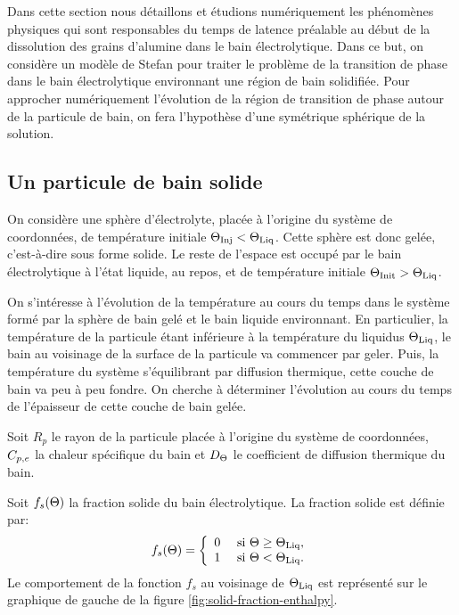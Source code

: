 Dans cette section nous détaillons et étudions numériquement les
phénomènes physiques qui sont responsables du temps de latence
préalable au début de la dissolution des grains d'alumine dans le bain
électrolytique. Dans ce but, on considère un modèle de Stefan pour
traiter le problème de la transition de phase dans le bain
électrolytique environnant une région de bain solidifiée. Pour
approcher numériquement l'évolution de la région de transition de
phase autour de la particule de bain, on fera l'hypothèse d'une
symétrique sphérique de la solution.

\subsection{Un particule de bain solide}
On considère une sphère d'électrolyte, placée à l'origine du système
de coordonnées, de température initiale $\Theta_\text{Inj}<\Theta_\text{Liq}$. Cette sphère
est donc gelée, c'est-à-dire sous forme solide. Le reste de l'espace
est occupé par le bain électrolytique à l'état liquide, au repos, et
de température initiale $\Theta_\text{Init} > \Theta_\text{Liq}$.

On s'intéresse à l'évolution de la température au cours du
temps dans le système formé par la sphère de bain gelé et le
bain liquide environnant. En particulier, la température de la
particule étant inférieure à la température du liquidus
$\Theta_\text{Liq}$, le bain au voisinage de la surface de la particule va
commencer par geler. Puis, la température du système s'équilibrant par
diffusion thermique, cette couche de bain va peu à peu fondre. On
cherche à déterminer l'évolution au cours du temps de l'épaisseur de
cette couche de bain gelée.

Soit $R_p$ le rayon de la particule placée à l'origine du
système de coordonnées, $C_{p,e}$ la chaleur spécifique du bain et
$D_\Theta$ le coefficient de diffusion thermique du bain.

Soit $f_s(\Theta)$ la fraction solide du bain électrolytique. La
fraction solide est définie par:
\begin{equation}
  f_s(\Theta) = \left\{
  \begin{array}{ll}
    0           & \text{ si } \Theta \geq \Theta_\text{Liq},\\
    1           & \text{ si } \Theta < \Theta_\text{Liq}.
  \end{array}
  \right.
\end{equation}
Le comportement de la fonction $f_s$ au voisinage de $\Theta_\text{Liq}$ est
représenté sur le graphique de gauche de la figure
\ref{fig:solid-fraction-enthalpy}.

